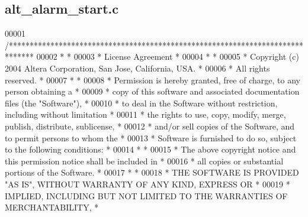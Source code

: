 \subsection{alt\+\_\+alarm\+\_\+start.\+c}
\label{alt__alarm__start_8c_source}

\begin{DoxyCode}
00001 \textcolor{comment}{/******************************************************************************}
00002 \textcolor{comment}{*                                                                             *}
00003 \textcolor{comment}{* License Agreement                                                           *}
00004 \textcolor{comment}{*                                                                             *}
00005 \textcolor{comment}{* Copyright (c) 2004 Altera Corporation, San Jose, California, USA.           *}
00006 \textcolor{comment}{* All rights reserved.                                                        *}
00007 \textcolor{comment}{*                                                                             *}
00008 \textcolor{comment}{* Permission is hereby granted, free of charge, to any person obtaining a     *}
00009 \textcolor{comment}{* copy of this software and associated documentation files (the "Software"),  *}
00010 \textcolor{comment}{* to deal in the Software without restriction, including without limitation   *}
00011 \textcolor{comment}{* the rights to use, copy, modify, merge, publish, distribute, sublicense,    *}
00012 \textcolor{comment}{* and/or sell copies of the Software, and to permit persons to whom the       *}
00013 \textcolor{comment}{* Software is furnished to do so, subject to the following conditions:        *}
00014 \textcolor{comment}{*                                                                             *}
00015 \textcolor{comment}{* The above copyright notice and this permission notice shall be included in  *}
00016 \textcolor{comment}{* all copies or substantial portions of the Software.                         *}
00017 \textcolor{comment}{*                                                                             *}
00018 \textcolor{comment}{* THE SOFTWARE IS PROVIDED "AS IS", WITHOUT WARRANTY OF ANY KIND, EXPRESS OR  *}
00019 \textcolor{comment}{* IMPLIED, INCLUDING BUT NOT LIMITED TO THE WARRANTIES OF MERCHANTABILITY,    *}

\end{DoxyCode}
